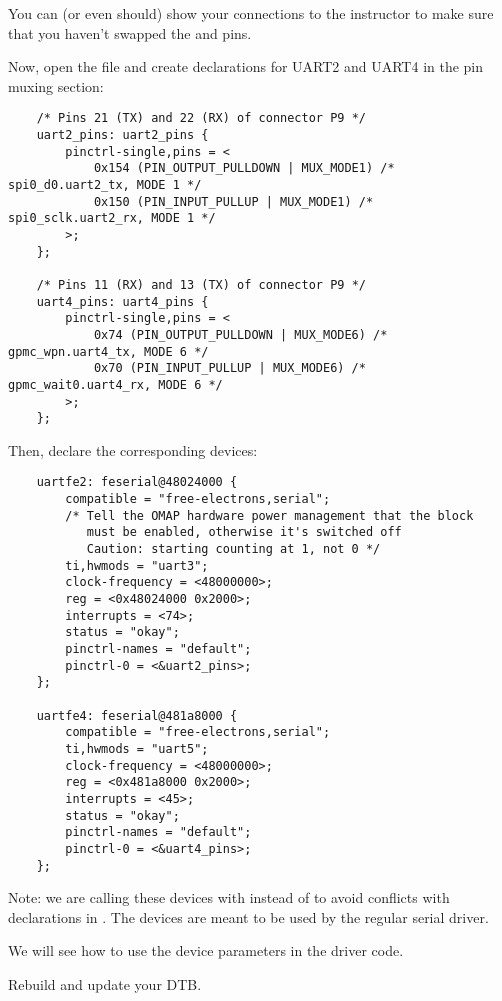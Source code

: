 You can (or even should) show your connections to the instructor
to make sure that you haven't swapped the  and  pins. 

Now, open the 
file and create declarations for UART2 and UART4 in the pin muxing
section:

\begin{verbatim}
    /* Pins 21 (TX) and 22 (RX) of connector P9 */
    uart2_pins: uart2_pins {
        pinctrl-single,pins = <
            0x154 (PIN_OUTPUT_PULLDOWN | MUX_MODE1) /* spi0_d0.uart2_tx, MODE 1 */
            0x150 (PIN_INPUT_PULLUP | MUX_MODE1) /* spi0_sclk.uart2_rx, MODE 1 */
        >;
    };

    /* Pins 11 (RX) and 13 (TX) of connector P9 */
    uart4_pins: uart4_pins {
        pinctrl-single,pins = <
            0x74 (PIN_OUTPUT_PULLDOWN | MUX_MODE6) /* gpmc_wpn.uart4_tx, MODE 6 */
            0x70 (PIN_INPUT_PULLUP | MUX_MODE6) /* gpmc_wait0.uart4_rx, MODE 6 */
        >;
    };
\end{verbatim}

Then, declare the corresponding devices:

\begin{verbatim}
    uartfe2: feserial@48024000 {
        compatible = "free-electrons,serial";
        /* Tell the OMAP hardware power management that the block
           must be enabled, otherwise it's switched off
           Caution: starting counting at 1, not 0 */
        ti,hwmods = "uart3";
        clock-frequency = <48000000>;
        reg = <0x48024000 0x2000>;
        interrupts = <74>;
        status = "okay";
        pinctrl-names = "default";
        pinctrl-0 = <&uart2_pins>;
    };

    uartfe4: feserial@481a8000 {
        compatible = "free-electrons,serial";
        ti,hwmods = "uart5";
        clock-frequency = <48000000>;
        reg = <0x481a8000 0x2000>;
        interrupts = <45>;
        status = "okay";
        pinctrl-names = "default";
        pinctrl-0 = <&uart4_pins>;
    };
\end{verbatim}

Note: we are calling these devices with  instead of
 to avoid conflicts with declarations in
. The  devices are 
meant to be used by the regular serial driver.

We will see how to use the device parameters in the driver code.

Rebuild and update your DTB.

